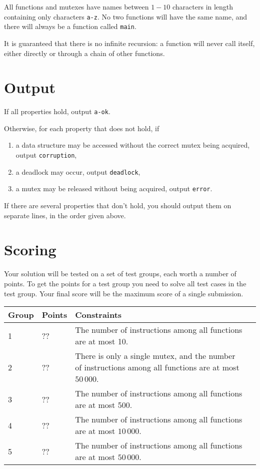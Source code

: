 All functions and mutexes have names between $1-10$ characters in length containing only characters \texttt{a-z}.
No two functions will have the same name, and there will always be a function called \texttt{main}.

It is guaranteed that there is no infinite recursion: a function will never call itself, either directly or through a chain of other functions.

\section*{Output}
If all properties hold, output \texttt{a-ok}.

Otherwise, for each property that does not hold, if
\begin{enumerate}
  \item a data structure may be accessed without the correct mutex being acquired, output \texttt{corruption},
  \item a deadlock may occur, output \texttt{deadlock},
  \item a mutex may be released without being acquired, output \texttt{error}.
\end{enumerate}

If there are several properties that don't hold, you should output them on separate lines, in the order given above.

\section*{Scoring}
Your solution will be tested on a set of test groups, each worth a number of points.
To get the points for a test group you need to solve all test cases in the test group.
Your final score will be the maximum score of a single submission.

\noindent
\begin{tabular}{| l | l | l | l |}
\hline
Group & Points & Constraints \\ \hline
1     & ??     & The number of instructions among all functions are at most 10. \\ \hline
2     & ??     & There is only a single mutex, and the number of instructions among all functions are at most $50\,000$. \\ \hline
3     & ??     & The number of instructions among all functions are at most 500. \\ \hline
4     & ??     & The number of instructions among all functions are at most $10\,000$. \\ \hline
5     & ??     & The number of instructions among all functions are at most $50\,000$. \\ \hline
\end{tabular}
